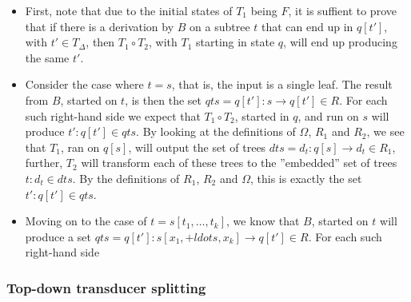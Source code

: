 \begin{itemize}
\item First, note that due to the initial states of $T_1$ being $F$, it is
suffient to prove that if there is a derivation by $B$ on a subtree $t$
that can end up in $q[t']$, with $t' \in T_\Delta$, then $T_1 \circ T_2$,
with $T_1$ starting in state $q$, will end up producing the same $t'$.

\item Consider the case where $t = s$, that is, the input is a single leaf.
The result from $B$, started on $t$, is then the set $qts = {q[t']: s \rightarrow
 q[t'] \in R}$. For each such right-hand side we expect that $T_1 \circ T_2$,
started in $q$, and run on $s$ will produce ${t' : q[t'] \in qts}$. By
looking at the definitions of $\Omega$, $R_1$ and $R_2$, we see that $T_1$,
ran on $q[s]$, will output the set of trees $dts = {d_t : q[s] \rightarrow d_t
  \in R_1}$, further, $T_2$ will transform each of these trees to the
''embedded'' set of trees ${t : d_t \in dts}$. By the definitions of $R_1$,
$R_2$ and $\Omega$, this is exactly the set ${t' : q[t'] \in qts}$.

\item Moving on to the case of $t = s[t_1,\ldots,t_k]$, we know that $B$,
started on $t$ will produce a set $qts = {q[t']: s[x_1,+ldots,x_k]
  \rightarrow q[t'] \in R}$. For
each such right-hand side

\end{itemize}



\subsubsection{Top-down transducer splitting}


